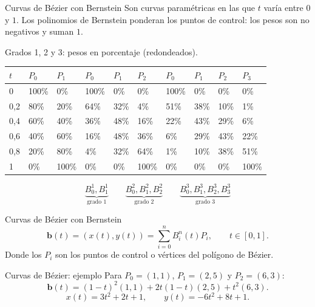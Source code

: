 \documentclass[main.tex]{subfiles}
\begin{document}
\begin{frame}[t]{Curvas de Bézier con Bernstein}
\small Son curvas paramétricas en las que $t$ varía entre $0$ y $1$. Los polinomios de Bernstein ponderan los puntos de control: los pesos son no negativos y suman $1$.\par\medskip\scriptsize Grados 1, 2 y 3: pesos en porcentaje (redondeados).\begingroup\scriptsize\setlength{\tabcolsep}{2pt}\begin{center}\begin{tabular}{|C{.082\textwidth}|C{.082\textwidth}|C{.082\textwidth}|C{.082\textwidth}|C{.082\textwidth}|C{.082\textwidth}|C{.082\textwidth}|C{.082\textwidth}|C{.082\textwidth}|C{.082\textwidth}|}\hline
$t$ & $P_0$ & $P_1$ & $P_0$ & $P_1$ & $P_2$ & $P_0$ & $P_1$ & $P_2$ & $P_3$\\\hline
\rule[-1.5mm]{0pt}{5mm}0 & 100\% & 0\% & 100\% & 0\% & 0\% & 100\% & 0\% & 0\% & 0\%\\\hline
\rule[-1.5mm]{0pt}{5mm}0,2 & 80\% & 20\% & 64\% & 32\% & 4\% & 51\% & 38\% & 10\% & 1\%\\\hline
\rule[-1.5mm]{0pt}{5mm}0,4 & 60\% & 40\% & 36\% & 48\% & 16\% & 22\% & 43\% & 29\% & 6\%\\\hline
\rule[-1.5mm]{0pt}{5mm}0,6 & 40\% & 60\% & 16\% & 48\% & 36\% & 6\% & 29\% & 43\% & 22\%\\\hline
\rule[-1.5mm]{0pt}{5mm}0,8 & 20\% & 80\% & 4\% & 32\% & 64\% & 1\% & 10\% & 38\% & 51\%\\\hline
\rule[-1.5mm]{0pt}{5mm}1 & 0\% & 100\% & 0\% & 0\% & 100\% & 0\% & 0\% & 0\% & 100\%\\\hline
\end{tabular}\end{center}\endgroup\[\underbrace{B_0^1,B_1^1}_{\text{grado 1}}\qquad\underbrace{B_0^2,B_1^2,B_2^2}_{\text{grado 2}}\qquad\underbrace{B_0^3,B_1^3,B_2^3,B_3^3}_{\text{grado 3}}\]
\end{frame}

\begin{frame}[t]{Curvas de Bézier con Bernstein}
\vspace{8mm}\[\boxed{\mathbf b(t)=(x(t),y(t))=\sum_{i=0}^{n}B_i^n(t)P_i},\qquad t\in[0,1].\]\bigskip Donde los $P_i$ son los puntos de control o vértices del polígono de Bézier.
\end{frame}

\begin{frame}[t]{Curvas de Bézier: ejemplo}
\small Para $P_0=(1,1)$, $P_1=(2,5)$ y $P_2=(6,3)$:\[\mathbf b(t)=(1-t)^2(1,1)+2t(1-t)(2,5)+t^2(6,3).\]\[x(t)=3t^2+2t+1,\qquad y(t)=-6t^2+8t+1.\]
\end{frame}
\end{document}
